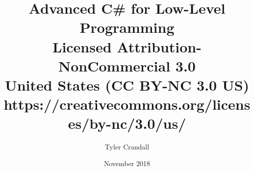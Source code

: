 \documentclass{book}
\begin{document}
\author{Tyler Crandall}
\title{Advanced C\# for Low-Level Programming\\
	   \large Licensed Attribution-NonCommercial 3.0 
	   \\United States (CC BY-NC 3.0 US) \\
   	   \small https://creativecommons.org/licenses/by-nc/3.0/us/}
\date{November 2018}

\frontmatter

\maketitle
\newpage

\tableofcontents

\mainmatter






\backmatter
\end{document}

